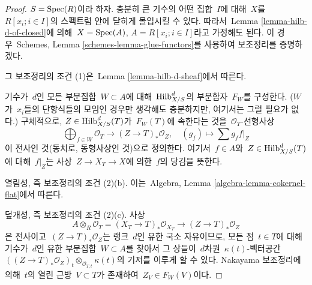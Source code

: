 \begin{proof}
$S = \mathop{\mathrm{Spec}}(R)$이라 하자. 충분히 큰 기수의 어떤 집합\  $I$에 대해\ 
$X$를\  $R[x_i; i \in I]$의 스펙트럼 안에 닫히게 몰입시킬 수 있다.
따라서\  Lemma \ref{lemma-hilb-d-of-closed}에 의해\ 
$X = \mathop{\mathrm{Spec}}(A)$, $A = R[x_i; i \in I]$라고 가정해도 된다.
이 경우\  Schemes, Lemma \ref{schemes-lemma-glue-functors}를 사용하여
보조정리를 증명하겠다.

\medskip\noindent
그 보조정리의 조건 (1)은\  Lemma \ref{lemma-hilb-d-sheaf}에서 따른다.

\medskip\noindent
기수가\  $d$인 모든 부분집합\  $W \subset A$에 대해\ 
$\mathrm{Hilb}^d_{X/S}$의 부분함자\  $F_W$를 구성한다.
($W$가\  $x_i$들의 단항식들의 모임인 경우만 생각해도 충분하지만,
여기서는 그럴 필요가 없다.) 구체적으로,
$Z \in \mathrm{Hilb}^d_{X/S}(T)$가\  $F_W(T)$에 속한다는 것을\ 
$\mathcal{O}_T$-선형사상
$$
\bigoplus\nolimits_{f \in W} \mathcal{O}_T
\longrightarrow
(Z \to T)_*\mathcal{O}_Z,\quad
(g_f) \longmapsto \sum g_f f|_Z
$$
이 전사인 것(동치로, 동형사상인 것)으로 정의한다. 여기서\ 
$f \in A$와\  $Z \in \mathrm{Hilb}^d_{X/S}(T)$에 대해\  $f|_Z$는 사상\ 
$Z \to X_T \to X$에 의한\  $f$의 당김을 뜻한다.

\medskip\noindent
열림성, 즉 보조정리의 조건 (2)(b). 이는\  Algebra, Lemma
\ref{algebra-lemma-cokernel-flat}에서 따른다.

\medskip\noindent
덮개성, 즉 보조정리의 조건 (2)(c). 사상
$$
A \otimes_R \mathcal{O}_T =
(X_T \to T)_*\mathcal{O}_{X_T} \to (Z \to T)_*\mathcal{O}_Z
$$
은 전사이고\  $(Z \to T)_*\mathcal{O}_Z$는 랭크\  $d$인 유한 국소 자유이므로,
모든 점\  $t \in T$에 대해 기수가\  $d$인 유한 부분집합\  $W \subset A$를
찾아서 그 상들이\  $d$차원\  $\kappa(t)$-벡터공간\ 
$((Z \to T)_*\mathcal{O}_Z)_t \otimes_{\mathcal{O}_{T, t}} \kappa(t)$의
기저를 이루게 할 수 있다. Nakayama 보조정리에 의해\  $t$의 열린 근방\ 
$V \subset T$가 존재하여\  $Z_V \in F_W(V)$이다.


\end{proof}
